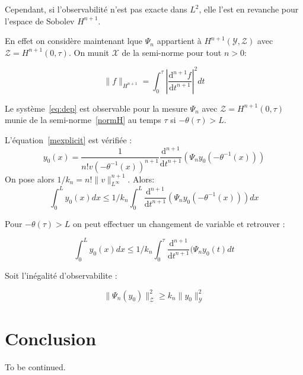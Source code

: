 \documentclass[a4paper]{article}
\begin{document}
Cependant, si l'observabilité n'est pas exacte dans $L^2$, elle l'est en revanche pour l'espace de Sobolev $H^{n+1}$. 

En effet on considère maintenant lque $\Psi_n$ appartient à $H^{n+1}(\mathscr{Y},\mathscr{Z})$ avec $\mathscr{Z}=H^{n+1}(0,\tau)$. 
On munit $\mathscr{X}$ de la semi-norme pour tout $n>0$:

\begin{equation}
	\label{normH}
	\|f \|_{H^{n+1} } = \int_0^{\tau} |\frac{\mathrm{d}^{n+1}f}{\mathrm{d}t^{n+1}}|^2 dt
\end{equation}


\begin{proposition}
	Le système~\eqref{eq:dep} est observable pour la mesure $\Psi_n$ avec $\mathscr{Z}=H^{n+1}(0,\tau)$ munie de la semi-norme~\eqref{normH} au temps $\tau$ si $ -\theta(\tau) > L$.
\end{proposition}

\begin{preuve}
	L'équation~\eqref{mexplicit} est vérifiée :
	\[y_0(x) = \frac{1}{n! v(-\theta^{-1}(x))^{n+1}} \frac{\mathrm{d}^{n+1}}{\mathrm{d}t^{n+1}} (\Psi_ny_0(-\theta^{-1}(x)))\]
	On pose alors $ 1/k_n = n! \| v\|_{L^\infty}^{n+1}$.
	Alors:
	\[ 
		\int_0^Ly_0(x)dx \leq 1/k_n \int_0^L \frac{\mathrm{d}^{n+1}}{\mathrm{d}t^{n+1}} (\Psi_ny_0(-\theta^{-1}(x))) dx
		\]
		
	Pour $ -\theta(\tau) > L$ on peut effectuer un changement de variable et retrouver :
	
	\[ \int_0^Ly_0(x)dx \leq 1/k_n \int_0^\tau \frac{\mathrm{d}^{n+1}}{\mathrm{d}t^{n+1}} (\Psi_ny_0(t) dt \]
	
	Soit l'inégalité d'observabilite :
	
	\[\| \Psi_n(y_0)\|_{\mathscr{Z}}^2 \geq k_n \|y_0\|^2_{\mathscr{Y}}\]
	
	
	
\end{preuve}
   

\section{Conclusion}

To be continued.


\medskip


	
\end{document}
